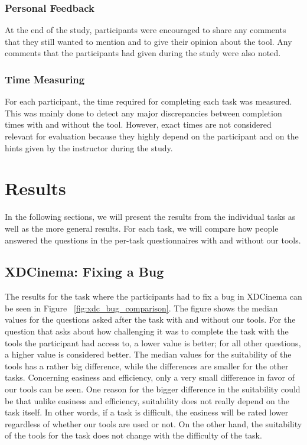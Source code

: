 \subsubsection{Personal Feedback}
At the end of the study, participants were encouraged to share any comments that they still wanted to mention and to give their opinion about the tool. Any comments that the participants had given during the study were also noted.

\subsubsection{Time Measuring}
For each participant, the time required for completing each task was measured. This was mainly done to detect any major discrepancies between completion times with and without the tool. However, exact times are not considered relevant for evaluation because they highly depend on the participant and on the hints given by the instructor during the study.

\section{Results}

In the following sections, we will present the results from the individual tasks as well as the more general results. For each task, we will compare how people answered the questions in the per-task questionnaires with and without our tools. 

\subsection{XDCinema: Fixing a Bug}

The results for the task where the participants had to fix a bug in XDCinema can be seen in Figure ~\ref{fig:xdc_bug_comparison}. The figure shows the median values for the questions asked after the task with and without our tools. For the question that asks about how challenging it was to complete the task with the tools the participant had access to, a lower value is better; for all other questions, a higher value is considered better. The median values for the suitability of the tools has a rather big difference, while the differences are smaller for the other tasks. Concerning easiness and efficiency, only a very small difference in favor of our tools can be seen. One reason for the bigger difference in the suitability could be that unlike easiness and efficiency, suitability does not really depend on the task itself. In other words, if a task is difficult, the easiness will be rated lower regardless of whether our tools are used or not. On the other hand, the suitability of the tools for the task does not change with the difficulty of the task.

